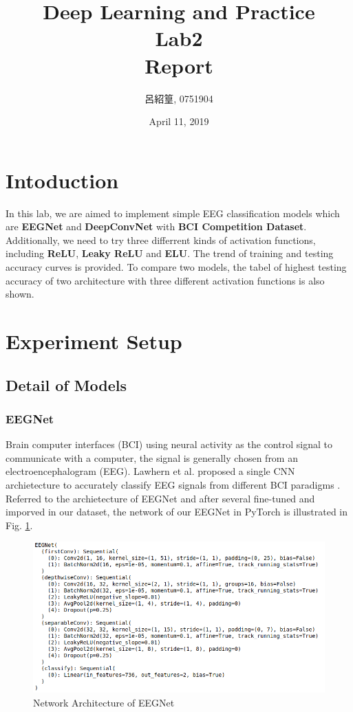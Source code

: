 \documentclass[12pt,a4paper]{article}
\title{Deep Learning and Practice \\Lab2 \\ Report}
\date{April 11, 2019}
\author{呂紹篁, 0751904}
\begin{document}
\thispagestyle{plain}
\cfoot{}
\maketitle

\section{Intoduction} \label{sec:intro}
In this lab, we are aimed to implement simple EEG classification models which are \textbf{EEGNet} and \textbf{DeepConvNet} with \textbf{BCI Competition Dataset}.
Additionally, we need to try three differrent kinds of activation functions, including \textbf{ReLU}, \textbf{Leaky ReLU} and \textbf{ELU}. The trend of training and testing accuracy curves is provided. To compare two models, the tabel of highest testing accuracy of two architecture with three different activation functions is also shown.

\section{Experiment Setup} \label{sec:exp_setup}
\subsection{Detail of Models}
\subsubsection{EEGNet}
Brain computer interfaces (BCI) using neural activity as the control signal to communicate with a computer, the signal is generally chosen from an electroencephalogram (EEG). Lawhern et al. proposed a single CNN archietecture to accurately classify EEG signals from different BCI paradigms \cite{lawhern2018eegnet}. \\
Referred to the archietecture of EEGNet and after several fine-tuned and imporved in our dataset, the network of our EEGNet in PyTorch \cite{paszke2017automatic} is illustrated in Fig. \ref{fig:eegnet}.
\begin{figure}[hbt]
\centering
\includegraphics[scale=0.4]{eeg.png}
\caption{Network Architecture of EEGNet}
\label{fig:eegnet}
\end{figure}
\end{document}
